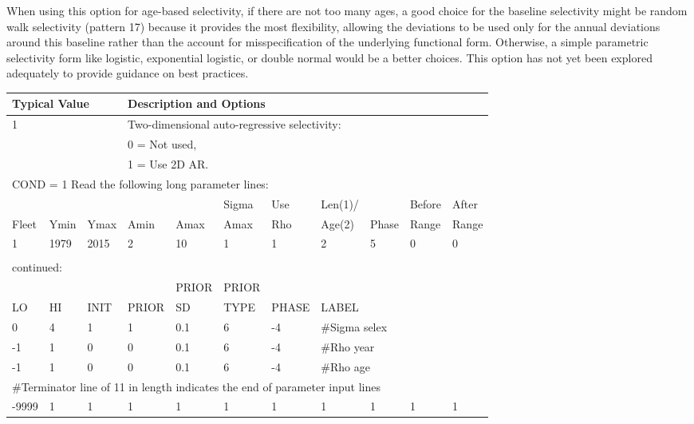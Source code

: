 When using this option for age-based selectivity, if there are not too many ages, a good choice for the baseline selectivity might be random walk selectivity (pattern 17) because it provides the most flexibility, allowing the deviations to be used only for the annual deviations around this baseline rather than the account for misspecification of the underlying functional form. Otherwise, a simple parametric selectivity form like logistic, exponential logistic, or double normal would be a better choices. This option has not yet been explored adequately to provide guidance on best practices.

\begin{longtable}{p{1cm} p{1cm} p{1cm} p{1.25cm} p{1.25cm} p{1.25cm} p{1.2cm} p{1.2cm} p{1cm} p{1cm} p{1cm}}
		
	\multicolumn{3}{l}{Typical Value} &  \multicolumn{8}{l}{Description and Options} \\
	\hline

	\multicolumn{3}{l}{1} & \multicolumn{8}{l}{Two-dimensional auto-regressive selectivity:}\Tstrut\\
	\multicolumn{3}{l}{ } & \multicolumn{8}{l}{0 = Not used,}\\
	\multicolumn{3}{l}{ } & \multicolumn{8}{l}{1 = Use 2D AR.}\Tstrut\\

	\multicolumn{11}{l}{COND = 1 Read the following long parameter lines:}\\
	\hline
	\Tstrut &    &      &      &      & Sigma & Use & Len(1)/ &       & Before & After\\
	Fleet & Ymin & Ymax & Amin & Amax & Amax  & Rho & Age(2)  & Phase & Range  & Range\Bstrut\\
	\hline
	   1    & 1979 & 2015 &  2   &  10  & 1     & 1   & 2       & 5     & 0   & 0\Tstrut\Bstrut\\
	\hline
	\\
	
	\multicolumn{11}{l}{continued:} \\
	\hline
	     &    &      &       & PRIOR & PRIOR &       &     & & & \Tstrut\\
	LO & HI & INIT & PRIOR & SD    & TYPE  & PHASE & \multicolumn{4}{l}{LABEL}\Bstrut\\
	\hline
	 0 & 4 & 1 & 1 & 0.1 & 6 & -4 & \multicolumn{4}{l}{\#Sigma selex}\Tstrut\\
	-1 & 1 & 0 & 0 & 0.1 & 6 & -4 & \multicolumn{4}{l}{\#Rho year}\\
	-1 & 1 & 0 & 0 & 0.1 & 6 & -4 & \multicolumn{4}{l}{\#Rho age}\Bstrut\\
	\multicolumn{11}{l}{\#Terminator line of 11 in length indicates the end of parameter input lines}\\
	-9999 & 1 & 1 & 1 & 1 & 1 & 1 & 1 & 1 & 1 & 1 \\
	\hline
\end{longtable}


